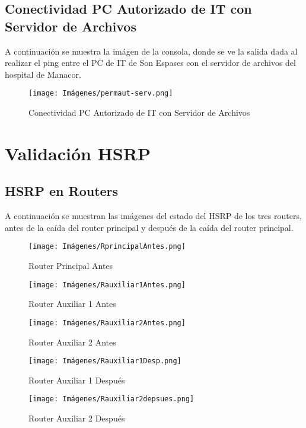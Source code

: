 \subsection{Conectividad PC Autorizado de IT con Servidor de Archivos}\label{anexo:permit-serv}
A continuación se muestra la imágen de la consola, donde se ve la salida dada al realizar el ping entre el PC de IT de Son Espases con el servidor de archivos del hospital de Manacor.
\begin{figure}[H]
    \centering
    \texttt{[image: Imágenes/permaut-serv.png]}
    \caption{Conectividad PC Autorizado de IT con Servidor de Archivos}
\end{figure}

\section{Validación HSRP}
\subsection{HSRP en Routers}\label{anexo:pruebahsrprou}
A continuación se muestran las imágenes del estado del HSRP de los tres routers, antes de la caída del router principal y después de la caída del router principal.
\begin{figure}[H]
    \centering
    \texttt{[image: Imágenes/RprincipalAntes.png]}
    \caption{Router Principal Antes}
\end{figure}
\begin{figure}[H]
    \centering
    \texttt{[image: Imágenes/Rauxiliar1Antes.png]}
    \caption{Router Auxiliar 1 Antes}
\end{figure}
\begin{figure}[H]
    \centering
    \texttt{[image: Imágenes/Rauxiliar2Antes.png]}
    \caption{Router Auxiliar 2 Antes}
\end{figure}
\begin{figure}[H]
    \centering
    \texttt{[image: Imágenes/Rauxiliar1Desp.png]}
    \caption{Router Auxiliar 1 Después}
\end{figure}
\begin{figure}[H]
    \centering
    \texttt{[image: Imágenes/Rauxiliar2depsues.png]}
    \caption{Router Auxiliar 2 Después}
\end{figure}

